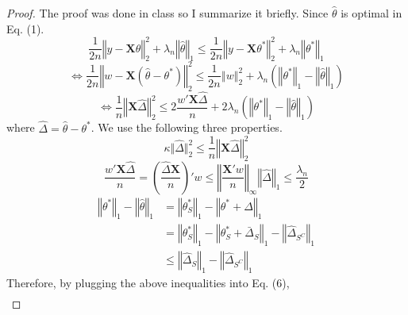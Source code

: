 \documentclass[a4paper, 11pt]{article}
\begin{document}
\begin{proof}
The proof was done in class so I summarize it briefly. Since $\hat{\theta}$ is optimal in Eq. (1). 
\begin{equation}
\frac{1}{2n} \left\Vert y-\mathbf{X}\hat{\theta} \right\Vert_2^2 +\lambda_n\left\Vert \hat{\theta} \right\Vert_1 \leq \frac{1}{2n} \left\Vert y-\mathbf{X}\theta^* \right\Vert_2^2 +\lambda_n\left\Vert \theta^* \right\Vert_1
\end{equation}
\begin{equation}
\iff \frac{1}{2n} \left\Vert w-\mathbf{X}(\hat{\theta}-\theta^*) \right\Vert_2^2 \leq \frac{1}{2n}\left\Vert w\right\Vert_2^2 + \lambda_n\left(\left\Vert\theta^* \right\Vert_1  - \left\Vert\hat{\theta} \right\Vert_1 \right)
\end{equation}
\begin{equation}
\iff \frac{1}{n}\left\Vert\mathbf{X}\hat{\Delta} \right\Vert_2^2 \leq 2\frac{w'\mathbf{X}\hat{\Delta}}{n} + 2\lambda_n \left(\left\Vert\theta^* \right\Vert_1  - \left\Vert\hat{\theta} \right\Vert_1 \right)
\end{equation}
where $\hat{\Delta} = \hat{\theta} - \theta^*$. We use the following three properties. 
\begin{equation}
\kappa\Vert\hat{\Delta}\Vert_2^2 \leq \frac{1}{n}\left\Vert\mathbf{X}\hat{\Delta} \right\Vert_2^2
\end{equation}
\begin{equation}
\frac{w'\mathbf{X}\hat{\Delta}}{n} = \left(\frac{\hat{\Delta}\mathbf{X}}{n}\right)'w \leq \left\Vert\frac{\mathbf{X}'w}{n} \right\Vert_\infty\left\Vert\hat{\Delta} \right\Vert_1 \leq \frac{\lambda_n}{2}
\end{equation}
\begin{equation}
\begin{split}
\left\Vert\theta^* \right\Vert_1  - \left\Vert\hat{\theta} \right\Vert_1 & = \left\Vert\theta_S^* \right\Vert_1 - \left\Vert \theta^*+\hat{\Delta} \right\Vert_1 \\ 
 & = \left\Vert\theta^*_S \right\Vert_1 - \left\Vert\theta_S^* + \bar{\Delta}_S \right\Vert_1 - \left\Vert\hat{\Delta}_{S^C} \right\Vert_1 \\
 & \leq \left\Vert\hat{\Delta}_S \right\Vert_1 - \left\Vert\hat{\Delta}_{S^C} \right\Vert_1 
\end{split}
\end{equation}
Therefore, by plugging the above inequalities into Eq. (6), 
\begin{equation}
\begin{split}

\end{split}
\end{equation}
\end{proof}
\end{document}
